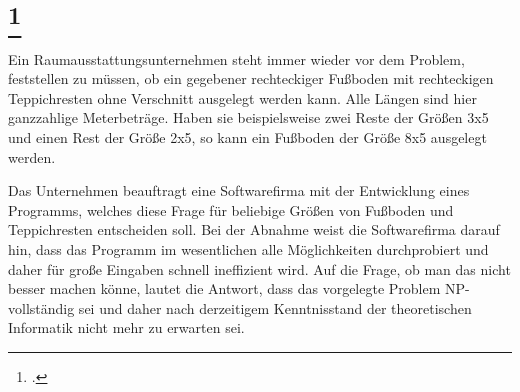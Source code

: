\documentclass{lehramt-informatik-aufgabe}
\begin{document}
\liAufgabenTitel{}
\section{
\footcite{46115:2016:03}}

Ein Raumausstattungsunternehmen steht immer wieder vor dem Problem,
feststellen zu müssen, ob ein gegebener rechteckiger Fußboden mit
rechteckigen Teppichresten ohne Verschnitt ausgelegt werden kann. Alle
Längen sind hier ganzzahlige Meterbeträge. Haben sie beispielsweise
zwei Reste der Größen 3x5 und einen Rest der Größe 2x5, so kann ein
Fußboden der Größe 8x5 ausgelegt werden.

Das Unternehmen beauftragt eine Softwarefirma mit der Entwicklung eines
Programms, welches diese Frage für beliebige Größen von Fußboden und
Teppichresten entscheiden soll. Bei der Abnahme weist die
Softwarefirma darauf hin, dass das Programm im wesentlichen alle
Möglichkeiten durchprobiert und daher für große Eingaben schnell
ineffizient wird. Auf die Frage, ob man das nicht besser machen könne,
lautet die Antwort, dass das vorgelegte Problem NP-vollständig sei und
daher nach derzeitigem Kenntnisstand der theoretischen Informatik nicht
mehr zu erwarten sei.
\end{document}
